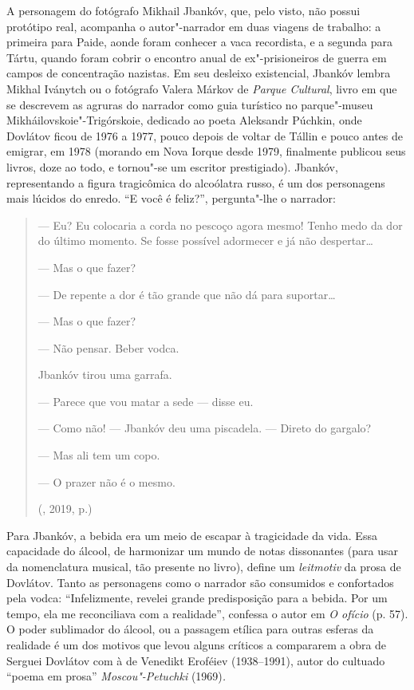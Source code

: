 A personagem do fotógrafo Mikhail Jbankóv, que, pelo visto, não possui
protótipo real, acompanha o autor"-narrador em duas viagens de trabalho:
a primeira para Paide, aonde foram conhecer a vaca recordista, e a
segunda para Tártu, quando foram cobrir o encontro anual de
ex"-prisioneiros de guerra em campos de concentração nazistas. Em seu
desleixo existencial, Jbankóv lembra Mikhal Iványtch ou o fotógrafo
Valera Márkov de \emph{Parque Cultural}, livro em que se descrevem as
agruras do narrador como guia turístico no parque"-museu
Mikháilovskoie"-Trigórskoie, dedicado ao poeta Aleksandr Púchkin, onde
Dovlátov ficou de 1976 a 1977, pouco depois de voltar de Tállin e pouco
antes de emigrar, em 1978 (morando em Nova Iorque desde 1979, finalmente
publicou seus livros, doze ao todo, e tornou"-se um escritor
prestigiado). Jbankóv, representando a figura tragicômica do alcoólatra
russo, é um dos personagens mais lúcidos do enredo. ``E você é feliz?'',
pergunta"-lhe o narrador:

\begin{quote}
\forceindent{}--- Eu? Eu colocaria a corda no pescoço agora mesmo! Tenho medo da dor
do último momento. Se fosse possível adormecer e já não despertar\ldots{}

--- Mas o que fazer?

--- De repente a dor é tão grande que não dá para suportar\ldots{}

--- Mas o que fazer?

--- Não pensar. Beber vodca.

Jbankóv tirou uma garrafa.

--- Parece que vou matar a sede --- disse eu.

--- Como não! --- Jbankóv deu uma piscadela. --- Direto do gargalo?

--- Mas ali tem um copo.

--- O prazer não é o mesmo.

(, 2019, p.)
\end{quote}

Para Jbankóv, a bebida era um meio de escapar à tragicidade da vida.
Essa capacidade do álcool, de harmonizar um mundo de notas dissonantes
(para usar da nomenclatura musical, tão presente no livro), define um
\emph{leitmotiv} da prosa de Dovlátov. Tanto as personagens como o
narrador são consumidos e confortados pela vodca: ``Infelizmente,
revelei grande predisposição para a bebida. Por um tempo, ela me
reconciliava com a realidade'', confessa o autor em \emph{O ofício} (p.
57). O poder sublimador do álcool, ou a passagem etílica para outras
esferas da realidade é um dos motivos que levou alguns críticos a
compararem a obra de Serguei Dovlátov com à de Venedikt Eroféiev
(1938--1991), autor do cultuado ``poema em prosa''
\emph{Moscou"-Petuchki} (1969)\emph{.}

